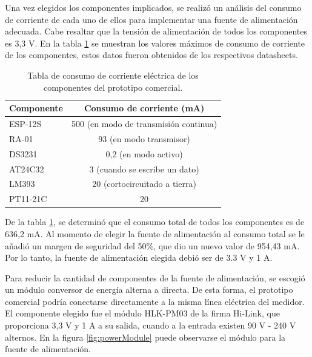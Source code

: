 Una vez elegidos los componentes implicados, se realizó un análisis del consumo de corriente de cada uno de ellos para implementar una fuente de alimentación adecuada. Cabe resaltar que la tensión de alimentación de todos los componentes es 3,3 V. En la tabla \ref{tab:componentsPower} se muestran los valores máximos de consumo de corriente de los componentes, estos datos fueron obtenidos de los respectivos datasheets.

\begin{table}[h]
	\centering
	\caption[Consumo de corriente del prototipo comercial]{Tabla de consumo de corriente eléctrica de los componentes del prototipo comercial.}
	\begin{tabular}{l c}    
		\toprule
		\textbf{Componente} & \textbf{Consumo de corriente (mA)} \\
		\midrule
		ESP-12S 	& 500 (en modo de transmisión continua) \\		
		RA-01		& 93 (en modo transmisor)\\
		DS3231		& 0,2 (en modo activo) \\
		AT24C32 	& 3 (cuando se escribe un dato)\\
		LM393 		& 20 (cortocircuitado a tierra) \\
		PT11-21C	& 20 \\
		\bottomrule
		\hline
	\end{tabular}
	\label{tab:componentsPower}
\end{table}

De la tabla \ref{tab:componentsPower}, se determinó que el consumo total de todos los componentes es de 636,2 mA. Al momento de elegir la fuente de alimentación al consumo total se le añadió un margen de seguridad del 50\%, que dio un nuevo valor de 954,43 mA. Por lo tanto, la fuente de alimentación elegida debió ser de 3.3 V y 1 A.

Para reducir la cantidad de componentes de la fuente de alimentación, se escogió un módulo conversor de energía alterna a directa. De esta forma, el prototipo comercial podría conectarse directamente a la misma línea eléctrica del medidor. El componente elegido fue el módulo HLK-PM03 de la firma Hi-Link, que proporciona 3,3 V y 1 A a su salida, cuando a la entrada existen 90 V - 240 V alternos. En la figura \ref{fig:powerModule} puede observarse el módulo para la fuente de alimentación.

